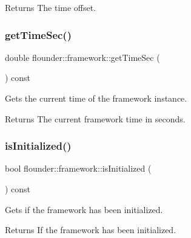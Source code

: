 \begin{DoxyReturn}{Returns}
The time offset. 
\end{DoxyReturn}
\mbox{\label{classflounder_1_1framework_acac765a2dd8e09267b7d6ce0620b8e55}} 
\subsubsection{\texorpdfstring{get\+Time\+Sec()}{getTimeSec()}}
{\footnotesize\ttfamily double flounder\+::framework\+::get\+Time\+Sec (\begin{DoxyParamCaption}{ }\end{DoxyParamCaption}) const\hspace{0.3cm}{\ttfamily [inline]}}



Gets the current time of the framework instance. 

\begin{DoxyReturn}{Returns}
The current framework time in seconds. 
\end{DoxyReturn}
\mbox{\label{classflounder_1_1framework_ad217b91b7e0f46f305105045396dcdf3}} 
\subsubsection{\texorpdfstring{is\+Initialized()}{isInitialized()}}
{\footnotesize\ttfamily bool flounder\+::framework\+::is\+Initialized (\begin{DoxyParamCaption}{ }\end{DoxyParamCaption}) const\hspace{0.3cm}{\ttfamily [inline]}}



Gets if the framework has been initialized. 

\begin{DoxyReturn}{Returns}
If the framework has been initialized. 
\end{DoxyReturn}
\mbox{\label{classflounder_1_1framework_a7e2584d7a3443c07b1d5eac2f44da14f}} 
